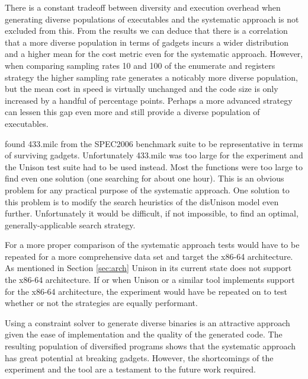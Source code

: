 There is a constant tradeoff between diversity and execution overhead when generating
diverse populations of executables and the systematic approach is not excluded from this.
From the results we can deduce that there is a correlation that a more diverse population
in terms of gadgets incurs a wider distribution and a higher mean for the cost metric even
for the systematic approach. However, when comparing sampling rates 10 and 100 of the
enumerate and registers strategy the higher sampling rate generates a noticably more
diverse population, but the mean cost in speed is virtually unchanged and the code size is
only increased by a handful of percentage points. Perhaps a more advanced strategy can
lessen this gap even more and still provide a diverse population of executables.

\textcite{large-scale-automated} found 433.milc from the SPEC2006 benchmark suite to be
representative in terms of surviving gadgets. Unfortunately 433.milc was too large for the
experiment and the Unison test suite had to be used instead. Most the functions were too
large to find even one solution (one searching for about one hour). This is an obvious
problem for any practical purpose of the systematic approach. One solution to this problem
is to modify the search heuristics of the disUnison model even further. Unfortunately it
would be difficult, if not impossible, to find an optimal, generally-applicable search
strategy.

For a more proper comparison of the systematic approach tests would have to be repeated for
a more comprehensive data set and target the x86-64 architecture. As mentioned in Section
\ref{sec:arch} Unison in its current state does not support the x86-64 architecture. If or
when Unison or a similar tool implements support for the x86-64 architecture, the
experiment would have be repeated on to test whether or not the strategies are equally
performant.

Using a constraint solver to generate diverse binaries is an attractive approach given
the ease of implementation and the quality of the generated code. The resulting population
of diversified programs shows that the systematic approach has great potential at breaking
gadgets. However, the shortcomings of the experiment and the tool are a testament to the
future work required.
